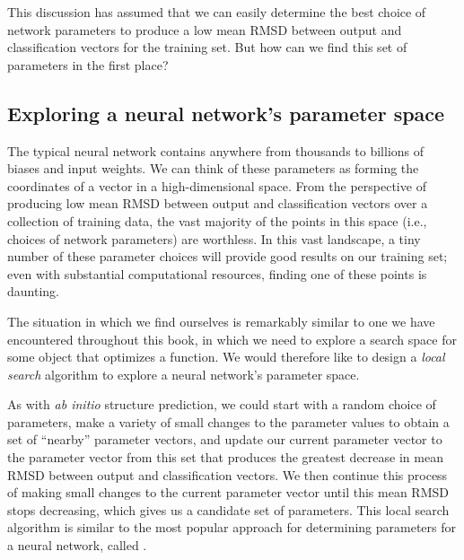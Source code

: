 This discussion has assumed that we can easily determine the best choice of network parameters to produce a low mean RMSD between output and classification vectors for the training set. But how can we find this set of parameters in the first place?

\subsection{Exploring a neural network's parameter space}

The typical neural network contains anywhere from thousands to billions of biases and input weights. We can think of these parameters as forming the coordinates of a vector in a high-dimensional space. From the perspective of producing low mean RMSD between output and classification vectors over a collection of training data, the vast majority of the points in this space (i.e., choices of network parameters) are worthless. In this vast landscape, a tiny number of these parameter choices will provide good results on our training set; even with substantial computational resources, finding one of these points is daunting.

The situation in which we find ourselves is remarkably similar to one we have encountered throughout this book, in which we need to explore a search space for some object that optimizes a function. We would therefore like to design a \textit{local search} algorithm to explore a neural network's parameter space.

As with \textit{ab initio} structure prediction, we could start with a random choice of parameters, make a variety of small changes to the parameter values to obtain a set of ``nearby'' parameter vectors, and update our current parameter vector to the parameter vector from this set that produces the greatest decrease in mean RMSD between output and classification vectors. We then continue this process of making small changes to the current parameter vector until this mean RMSD stops decreasing, which gives us a candidate set of parameters. This local search algorithm is similar to the most popular approach for determining parameters for a neural network, called .\\

\begin{qbox}\end{qbox}

